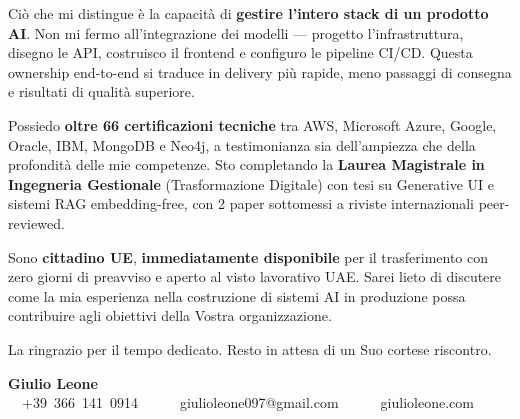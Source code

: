 \documentclass[11pt,a4paper,sans]{moderncv}
\begin{document}
\vspace{0.5em}

Ci\`o che mi distingue \`e la capacit\`a di \textbf{gestire l'intero stack di un prodotto AI}. Non mi fermo all'integrazione dei modelli --- progetto l'infrastruttura, disegno le API, costruisco il frontend e configuro le pipeline CI/CD. Questa ownership end-to-end si traduce in delivery pi\`u rapide, meno passaggi di consegna e risultati di qualit\`a superiore.

\vspace{0.5em}

Possiedo \textbf{oltre 66 certificazioni tecniche} tra AWS, Microsoft Azure, Google, Oracle, IBM, MongoDB e Neo4j, a testimonianza sia dell'ampiezza che della profondit\`a delle mie competenze. Sto completando la \textbf{Laurea Magistrale in Ingegneria Gestionale} (Trasformazione Digitale) con tesi su Generative UI e sistemi RAG embedding-free, con 2 paper sottomessi a riviste internazionali peer-reviewed.

\vspace{0.5em}

Sono \textbf{cittadino UE}, \textbf{immediatamente disponibile} per il trasferimento con zero giorni di preavviso e aperto al visto lavorativo UAE. Sarei lieto di discutere come la mia esperienza nella costruzione di sistemi AI in produzione possa contribuire agli obiettivi della Vostra organizzazione.

\vspace{0.8em}

La ringrazio per il tempo dedicato. Resto in attesa di un Suo cortese riscontro.

\vspace{1.2em}

\textbf{Giulio Leone}\\
\faPhone~~+39~366~141~0914~~\textbar~~\faEnvelope~~giulioleone097@gmail.com~~\textbar~~\faGlobe~~giulioleone.com
\end{document}
